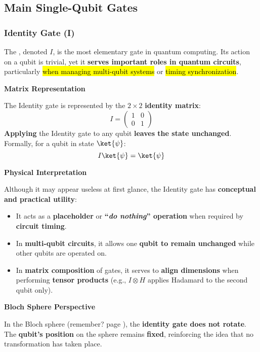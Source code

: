 \subsection{Main Single-Qubit Gates}

\subsubsection{Identity Gate (I)}

The , denoted $I$, is the most elementary gate in quantum computing. Its action on a qubit is trivial, yet it \textbf{serves important roles in quantum circuits}, particularly \hl{when managing multi-qubit systems} or \hl{timing synchronization}.

\highspace
\begin{flushleft}
    \textcolor{Green3}{ \textbf{Matrix Representation}}
\end{flushleft}
The Identity gate is represented by the $2 \times 2$ \textbf{identity matrix}:
\begin{equation}
    I = \begin{pmatrix}
        1 & 0 \\ 0 & 1
    \end{pmatrix}
\end{equation}
\textbf{Applying} the Identity gate to any qubit \textbf{leaves the state unchanged}. Formally, for a qubit in state $\ket{\psi}$:
\begin{equation*}
    I \ket{\psi} = \ket{\psi}
\end{equation*}

\highspace
\begin{flushleft}
    \textcolor{Green3}{ \textbf{Physical Interpretation}}
\end{flushleft}
Although it may appear useless at first glance, the Identity gate has \textbf{conceptual and practical utility}:
\begin{itemize}[label=\textcolor{Green3}{}]
    \item It acts as a \textbf{placeholder} or \textbf{``\emph{do nothing}'' operation} when required by \textbf{circuit timing}.
    \item In \textbf{multi-qubit circuits}, it allows one \textbf{qubit to remain unchanged} while other qubits are operated on.
    \item In \textbf{matrix composition} of gates, it serves to \textbf{align dimensions} when performing \textbf{tensor products} (e.g., $I \otimes H$ applies Hadamard to the second qubit only).
\end{itemize}

\highspace
\begin{flushleft}
    \textcolor{Green3}{ \textbf{Bloch Sphere Perspective}}
\end{flushleft}
In the Bloch sphere (remember? page \pageref{fig: Bloch sphere representation of qubit}), the \textbf{identity gate does not rotate}. The \textbf{qubit's position} on the sphere remains \textbf{fixed}, reinforcing the idea that no transformation has taken place.

